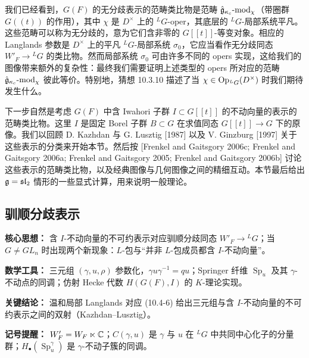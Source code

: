 我们已经看到，$G(F)$ 的无分歧表示的范畴类比物是范畴 $\hat{\mathfrak{g}}_{\kappa_c}\text{-}\mathrm{mod}_\chi$（带圈群 $G((t))$ 的作用），其中 $\chi$ 是 $D^\times$ 上的 ${}^L G$-oper，其底层的 ${}^L G$-局部系统平凡。这些范畴可以称为无分歧的，意为它们含非零的 $G[[t]]$-等变对象。相应的 Langlands 参数是 $D^\times$ 上的平凡 ${}^L G$-局部系统 $\sigma_0$，它应当看作无分歧同态 $W'_F\to{}^L G$ 的类比物。然而局部系统 $\sigma_0$ 可由许多不同的 opers 实现，这给我们的图像带来额外的复杂性：最终我们需要证明上述类型的 opers 所对应的范畴 $\hat{\mathfrak{g}}_{\kappa_c}\text{-}\mathrm{mod}_\chi$ 彼此等价。特别地，猜想 10.3.10 描述了当 $\chi\in\operatorname{Op}_{{}^L G}(D^\times)$ 时我们期待发生什么。

下一步自然是考虑 $G(F)$ 中含 Iwahori 子群 $I\subset G[[t]]$ 的不动向量的表示的范畴类比物。这里 $I$ 是固定 Borel 子群 $B\subset G$ 在求值同态 $G[[t]]\to G$ 下的原像。我们以回顾 D. Kazhdan 与 G. Lusztig [1987] 以及 V. Ginzburg [1997] 关于这些表示的分类来开始本节。然后按 [Frenkel and Gaitsgory 2006c; Frenkel and Gaitsgory 2006a; Frenkel and Gaitsgory 2005; Frenkel and Gaitsgory 2006b] 讨论这些表示的范畴类比物，以及经典图像与几何图像之间的精细互动。本节最后给出 $\mathfrak{g}=\mathfrak{sl}_2$ 情形的一些显式计算，用来说明一般理论。

\subsection{驯顺分歧表示}

\begin{keypoints}
    \item \textbf{核心思想：} 含 $I$-不动向量的不可约表示对应驯顺分歧同态 $W'_F\to{}^L G$；当 $G\neq GL_n$ 时出现两个新现象：$L$-包与“并非 $L$-包成员都含 $I$-不动向量”。
    \item \textbf{数学工具：} 三元组 $(\gamma,u,\rho)$ 参数化，$\gamma u\gamma^{-1}=qu$；Springer 纤维 $\operatorname{Sp}_u$ 及其 $\gamma$-不动点的同调；仿射 Hecke 代数 $H(G(F),I)$ 的 $K$-理论实现。
    \item \textbf{关键结论：} 温和局部 Langlands 对应 (10.4-6) 给出三元组与含 $I$-不动向量的不可约表示之间的双射（Kazhdan--Lusztig）。
    \item \textbf{记号提醒：} $W'_F=W_F\ltimes\mathbb{C}$；$C(\gamma,u)$ 是 $\gamma$ 与 $u$ 在 ${}^L G$ 中共同中心化子的分量群；$H_\bullet(\operatorname{Sp}_u^\gamma)$ 是 $\gamma$-不动子簇的同调。
\end{keypoints}

